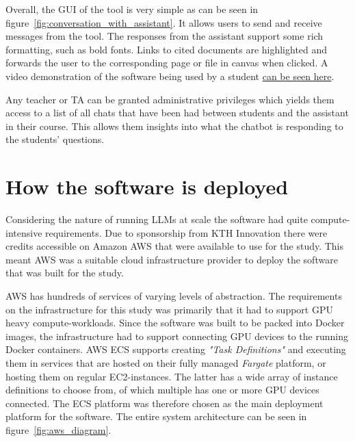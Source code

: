 


Overall, the \gls{GUI} of the tool is very simple as can be seen in figure~\ref{fig:conversation_with_assistant}. It allows users to send and receive messages from the tool. The responses from the assistant support some rich formatting, such as bold fonts. Links to cited documents are highlighted and forwards the user to the corresponding page or file in canvas when clicked. A video demonstration of the software being used by a student \href{https://www.youtube.com/watch?v=spdZ4jwI8mo}{can be seen here}.


Any teacher or TA can be granted administrative privileges which yields them access to a list of all chats that have been had between students and the assistant in their course. This allows them insights into what the chatbot is responding to the students' questions.





% 


\section{How the software is deployed}


Considering the nature of running \gls{LLM}s at scale the software had quite compute-intensive requirements. Due to sponsorship from KTH Innovation there were credits accessible on Amazon AWS that were available to use for the study. This meant AWS was a suitable cloud infrastructure provider to deploy the software that was built for the study.


AWS has hundreds of services of varying levels of abstraction. The requirements on the infrastructure for this study was primarily that it had to support GPU heavy compute-workloads. Since the software was built to be packed into Docker images, the infrastructure had to support connecting GPU devices to the running Docker containers. AWS \gls{ECS} supports creating \textit{"Task Definitions"} and executing them in services that are hosted on their fully managed \textit{Fargate} platform, or hosting them on regular \gls{EC2}-instances. The latter has a wide array of instance definitions to choose from, of which multiple has one or more GPU devices connected. The \gls{ECS} platform was therefore chosen as the main deployment platform for the software. The entire system architecture can be seen in figure~\ref{fig:aws_diagram}.


